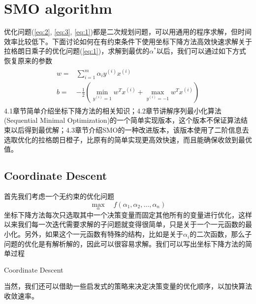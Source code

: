 \documentclass[11pt]{article}
\begin{document}
\section{SMO algorithm}
优化问题(\ref{eq:2}, \ref{eq:3}, \ref{eq:1})都是二次规划问题，可以用通用的程序求解，但时间效率比较低下。下面讨论如何在有约束条件下使用坐标下降方法高效快速求解关于拉格朗日乘子的优化问题(\ref{eq:1})，求解到最优的$\alpha^*$以后，我们可以通过如下方式恢复原来的参数
\begin{align}\label{eq:wb}
\begin{split}
w=&\sum_{i=1}^m\alpha_iy^{(i)}x^{(i)}\\
b=&-\frac{1}{2}\left(\min_{y^{(i)}=1}w^Tx^{(i)} + \max_{y^{(i)}=-1}w^Tx^{(i)}\right)
\end{split}
\end{align}
4.1章节简单介绍坐标下降方法的相关知识；4.2章节讲解序列最小化算法(Sequential Minimal Optimization)的一个简单实现版本，这个版本不保证算法结束以后得到最优解；4.3章节介绍SMO的一种改进版本，该版本使用了二阶信息去选取优化的拉格朗日橙子，比原有的简单实现更高效快速，而且能确保收敛到最优值。

\subsection{Coordinate Descent}
首先我们考虑一个无约束的优化问题
\begin{equation}
\max_\alpha\quad f(\alpha_1, \alpha_2, ..., \alpha_n)
\end{equation}
坐标下降方法每次只选取其中一个决策变量而固定其他所有的变量进行优化，这样以来我们每一次迭代需要求解的子问题就变得很简单，只是关于一个一元函数的最小化。另外，如果这个一元函数有特殊的结构，比如是关于$\alpha_i$的二次函数，那么子问题的优化是有解析解的，因此可以很容易求解。我们可以写出坐标下降方法的简单过程

\begin{algorithm}[H] 
	\caption{Coordinate Descent}
	\label{alg:loop}
	\begin{algorithmic}[1]
		\Statex
		\EndFor
		\EndWhile
	\end{algorithmic}
\end{algorithm}

当然，我们还可以借助一些启发式的策略来决定决策变量的优化顺序，以加快算法收敛速率。
\end{document}
